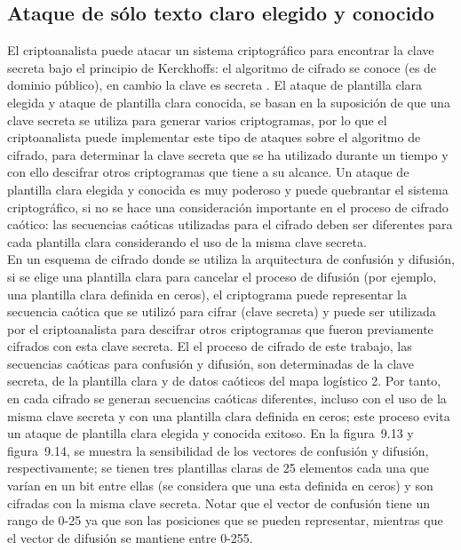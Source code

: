 \subsection{Ataque de sólo texto claro elegido y conocido}
El criptoanalista puede atacar un sistema criptográfico para encontrar la clave secreta bajo el principio de Kerckhoffs: el algoritmo de cifrado se conoce (es de dominio público), en cambio la clave es secreta \cite{P_2011}. El ataque de plantilla clara elegida y ataque de plantilla clara conocida, se basan en la suposición de que una clave secreta se utiliza para generar varios criptogramas, por lo que el criptoanalista puede implementar este tipo de ataques sobre el algoritmo de cifrado, para determinar la clave secreta que se ha utilizado durante un tiempo y con ello descifrar otros criptogramas que tiene a su alcance. Un ataque de plantilla clara elegida y conocida es muy poderoso y puede quebrantar el sistema criptográfico, si no se hace una consideración importante en el proceso de cifrado caótico: las secuencias caóticas utilizadas para el cifrado deben ser diferentes para cada plantilla clara considerando el uso de la misma clave secreta.  \\

En un esquema de cifrado donde se utiliza la arquitectura de confusión y difusión, si se elige una plantilla clara para cancelar el proceso de difusión (por ejemplo, una plantilla clara definida en ceros), el criptograma puede representar la secuencia caótica que se utilizó para cifrar (clave secreta) y puede ser utilizada por el criptoanalista para descifrar otros criptogramas que fueron previamente cifrados con esta clave secreta. El el proceso de cifrado de este trabajo, las secuencias caóticas para confusión y difusión, son determinadas de la clave secreta, de la plantilla clara y de datos caóticos del mapa logístico 2. Por tanto, en cada cifrado se generan secuencias caóticas diferentes, incluso con el uso de la misma clave secreta y con una plantilla clara definida en ceros; este proceso evita un ataque de plantilla clara elegida y conocida exitoso. En la figura~9.13 y figura~9.14, se muestra la sensibilidad de los vectores de confusión y difusión, respectivamente; se tienen tres plantillas claras de 25 elementos cada una que varían en un bit entre ellas (se considera que una esta definida en ceros) y son cifradas con la misma clave secreta. Notar que el vector de confusión tiene un rango de 0-25 ya que son las posiciones que se pueden representar, mientras que el vector de difusión se mantiene entre 0-255. \\

